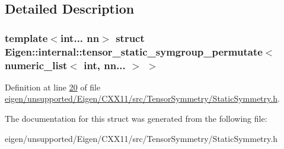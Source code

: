 \subsection{Detailed Description}
\subsubsection*{template$<$int... nn$>$\newline
struct Eigen\+::internal\+::tensor\+\_\+static\+\_\+symgroup\+\_\+permutate$<$ numeric\+\_\+list$<$ int, nn... $>$ $>$}



Definition at line \hyperlink{eigen_2unsupported_2_eigen_2_c_x_x11_2src_2_tensor_symmetry_2_static_symmetry_8h_source_l00020}{20} of file \hyperlink{eigen_2unsupported_2_eigen_2_c_x_x11_2src_2_tensor_symmetry_2_static_symmetry_8h_source}{eigen/unsupported/\+Eigen/\+C\+X\+X11/src/\+Tensor\+Symmetry/\+Static\+Symmetry.\+h}.



The documentation for this struct was generated from the following file\+:\begin{DoxyCompactItemize}
\item 
eigen/unsupported/\+Eigen/\+C\+X\+X11/src/\+Tensor\+Symmetry/\+Static\+Symmetry.\+h\end{DoxyCompactItemize}
